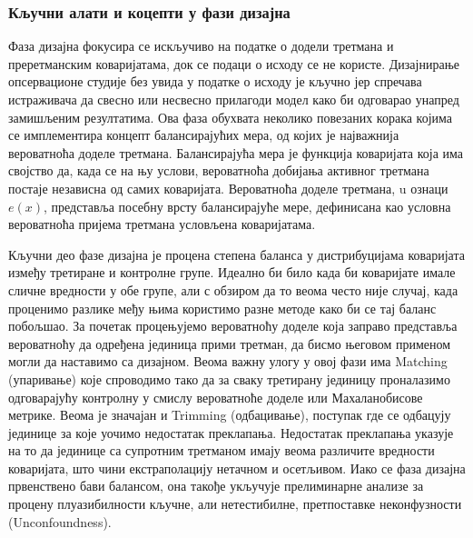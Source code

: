 \documentclass[12pt, a4paper]{article}
\begin{document}
\subsubsection{Кључни алати и коцепти у фази дизајна}
Фаза дизајна фокусира се искључиво на податке о додели третмана и преретманским коваријатама, док се подаци о исходу се не користе. Дизајнирање опсервационе студије без увида у податке о исходу је кључно јер спречава истраживача да свесно или несвесно прилагоди модел како би одговарао унапред замишљеним резултатима. Ова фаза обухвата неколико повезаних корака којима се имплементира концепт балансирајућих мера, од којих је најважнија вероватноћа доделе третмана. Балансирајућа мера је функција коваријата која има својство да, када се на њу услови, вероватноћа добијања активног третмана постаје независна од самих коваријата. Вероватноћа доделе третмана, u ознаци $e(x)$, представља посебну врсту балансирајуће мере, дефинисана као условна вероватноћа пријема третмана условљена коваријатама.  

Кључни део фазе дизајна је процена степена баланса у дистрибуцијама коваријата између третиране и контролне групе. Идеално би било када би коваријате имале сличне вредности у обе групе, али с обзиром да то веома често није случај, када проценимо разлике међу њима користимо разне методе како би се тај баланс побољшао. За почетак  процењујемо вероватноћу доделе која заправо представља вероватноћу да одређена јединица прими третман, да бисмо његовом применом могли да наставимо са дизајном. Веома важну улогу у овој фази има  Matching (упаривање) које спроводимо тако да за сваку третирану јединицу проналазимо одговарајућу контролну у смислу вероватноће доделе или Махаланобисове метрике. Веома је значајан и  Trimming (одбацивање), поступак где се одбацују јединице за које уочимо недостатак преклапања. Недостатак преклапања указује на то да јединице са супротним третманом имају веома различите вредности коваријата, што чини екстраполацију нетачном и осетљивом. Иако се фаза дизајна првенствено бави балансом, она такође укључује прелиминарне анализе за процену плуазибилности кључне, али нетестибилне, претпоставке неконфузности (Unconfoundness).
\end{document}
